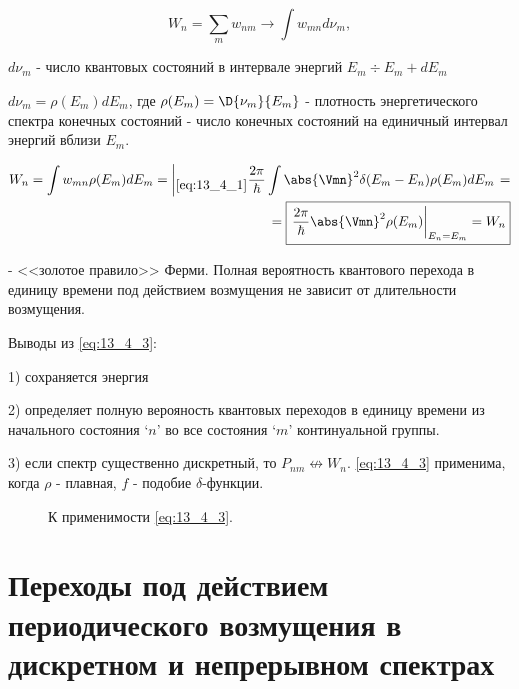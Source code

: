 $$
W_n = \sum_m w_{nm} \to \int w_{mn} d \nu_m,
$$

$d \nu_m$ - число квантовых состояний в интервале энергий $E_m \div E_m + dE_m$

$\boxed{d \nu_m = \rho(E_m) dE_m}$, где $\rho(E_m) = \D{\nu_m}{E_m}$ - плотность энергетического спектра конечных состояний - число конечных состояний на единичный интервал энергий вблизи $E_m$.

\begin{eqnarray}
W_n = \int w_{mn} \rho(E_m)dE_m = \left |_{\eqref{eq:13_4_1}} \dfrac{2\pi}{\hbar} \int \abs{\Vmn}^2 \delta(E_m - E_n) \rho(E_m)dE_m \right .= \nonumber \\
\label{eq:13_4_3} = \boxed{ \left. \frac{2\pi}{\hbar} \abs{\Vmn}^2 \rho(E_m) \right|_{E_n = E_m} = W_n}
\end{eqnarray}

- <<золотое правило>> Ферми. Полная вероятность квантового перехода в единицу времени под действием возмущения не зависит от длительности возмущения.

Выводы из \eqref{eq:13_4_3}:

1) сохраняется энергия

2) определяет полную верояность квантовых переходов в единицу времени из начального состояния `$n$' во все состояния `$m$' континуальной группы. 

3) если спектр существенно дискретный, то $P_{nm} \not \leftrightarrow W_n$. \eqref{eq:13_4_3} применима, когда $\rho$ - плавная, $f$ - подобие $\delta$-функции.

\begin{figure}[h!]
\centering
{}
\caption{К применимости \eqref{eq:13_4_3}.} \label{fig:13_4}
\end{figure}

\section{Переходы под действием периодического возмущения в дискретном и непрерывном спектрах}

